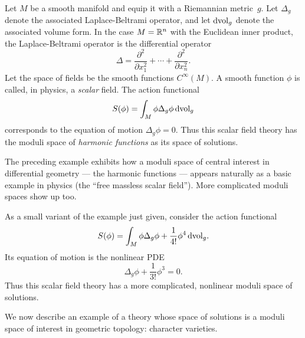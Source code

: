 \documentclass[11pt]{amsart}
\begin{document}
\begin{eg}
\label{eg: massless scalar}
Let $M$ be a smooth manifold and equip it with a Riemannian metric~$g$.
Let $\Delta_g$ denote the associated Laplace-Beltrami operator, 
and let ${\rm d}{\rm vol}_g$ denote the associated volume form.
In the case $M = \mathbb R^n$ with the Euclidean inner product, the Laplace-Beltrami operator is the differential operator
\[
\Delta = \frac{\partial^2}{\partial x_1^2} + \cdots + \frac{\partial^2}{\partial x_n^2}.
\]
Let the space of fields be the smooth functions $C^\infty(M)$.
A smooth function $\phi$ is called, in physics, a {\em scalar} field.
The action functional
\[
S(\phi) = \int_M \phi \Delta_g \phi \, {\rm d}{\rm vol}_g
\]
corresponds to the equation of motion $\Delta_g \phi = 0$. 
Thus this scalar field theory has the moduli space of {\em harmonic functions} as its space of solutions.
\end{eg}

The preceding example exhibits how a moduli space of central interest in differential geometry --- the harmonic functions --- appears naturally as a basic example in physics (the ``free massless scalar field'').
More complicated moduli spaces show up too.

\begin{eg}
As a small variant of the example just given,
consider the action functional
\[
S(\phi) = \int_M \phi \Delta_g \phi + \frac{1}{4!} \phi^4\, {\rm d}{\rm vol}_g.
\]
Its equation of motion is the nonlinear PDE 
\[
\Delta_g \phi + \frac{1}{3!} \phi^3 = 0.
\] 
Thus this scalar field theory has a more complicated, nonlinear moduli space of solutions.
\end{eg}

We now describe an example of a theory whose space of solutions is a moduli space of interest in geometric topology: character varieties.
\end{document}
